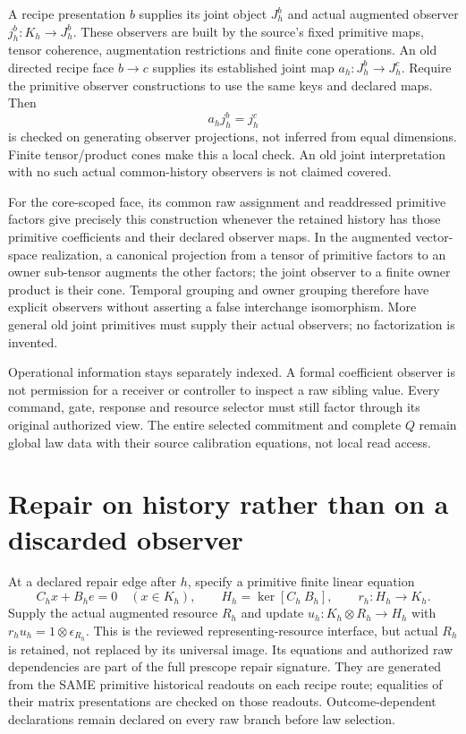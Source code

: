 \documentclass{article}
\begin{document}
A recipe presentation $b$ supplies its joint object $J^b_h$ and actual augmented observer $j^b_h:K_h\to J^b_h$. These observers are built by the source's fixed primitive maps, tensor coherence, augmentation restrictions and finite cone operations. An old directed recipe face $b\to c$ supplies its established joint map $a_h:J^b_h\to J^c_h$. Require the primitive observer constructions to use the same keys and declared maps. Then
\[
                         a_hj^b_h=j^c_h                    \tag{O}
\]
is checked on generating observer projections, not inferred from equal dimensions. Finite tensor/product cones make this a local check. An old joint interpretation with no such actual common-history observers is not claimed covered.

For the core-scoped face, its common raw assignment and readdressed primitive factors give precisely this construction whenever the retained history has those primitive coefficients and their declared observer maps. In the augmented vector-space realization, a canonical projection from a tensor of primitive factors to an owner sub-tensor augments the other factors; the joint observer to a finite owner product is their cone. Temporal grouping and owner grouping therefore have explicit observers without asserting a false interchange isomorphism. More general old joint primitives must supply their actual observers; no factorization is invented.

Operational information stays separately indexed. A formal coefficient observer is not permission for a receiver or controller to inspect a raw sibling value. Every command, gate, response and resource selector must still factor through its original authorized view. The entire selected commitment and complete $Q$ remain global law data with their source calibration equations, not local read access.

\section{Repair on history rather than on a discarded observer}
At a declared repair edge after $h$, specify a primitive finite linear equation
\[
 C_hx+B_he=0\quad(x\in K_h),\qquad
 H_h=\ker[C_h\ B_h],\qquad r_h:H_h\to K_h.
\]
Supply the actual augmented resource $R_h$ and update $u_h:K_h\otimes R_h\to H_h$ with $r_hu_h=1\otimes\epsilon_{R_h}$. This is the reviewed representing-resource interface, but actual $R_h$ is retained, not replaced by its universal image. Its equations and authorized raw dependencies are part of the full prescope repair signature. They are generated from the SAME primitive historical readouts on each recipe route; equalities of their matrix presentations are checked on those readouts. Outcome-dependent declarations remain declared on every raw branch before law selection.
\end{document}
